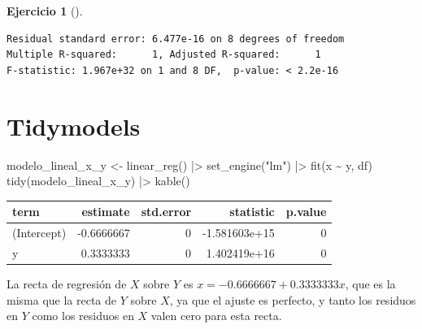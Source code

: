 \documentclass[
  a4paper,
]{scrreport}
\newenvironment{Shaded}{\begin{snugshade}}{\end{snugshade}}
\newcommand{\FunctionTok}[1]{\textcolor[rgb]{0.28,0.35,0.67}{#1}}
\newcommand{\NormalTok}[1]{\textcolor[rgb]{0.00,0.23,0.31}{#1}}
\newcommand{\OtherTok}[1]{\textcolor[rgb]{0.00,0.23,0.31}{#1}}
\newcommand{\SpecialCharTok}[1]{\textcolor[rgb]{0.37,0.37,0.37}{#1}}
\newcommand{\StringTok}[1]{\textcolor[rgb]{0.13,0.47,0.30}{#1}}
\theoremstyle{definition}
\newtheorem{exercise}{Ejercicio}[chapter]
\theoremstyle{remark}
\begin{document}
\begin{exercise}[]
\begin{enumerate}
\begin{tcolorbox}
\begin{verbatim}
Residual standard error: 6.477e-16 on 8 degrees of freedom
Multiple R-squared:      1, Adjusted R-squared:      1 
F-statistic: 1.967e+32 on 1 and 8 DF,  p-value: < 2.2e-16
\end{verbatim}

  \section{Tidymodels}

\begin{Shaded}
\begin{Highlighting}[]
\NormalTok{modelo\_lineal\_x\_y }\OtherTok{\textless{}{-}} \FunctionTok{linear\_reg}\NormalTok{() }\SpecialCharTok{|\textgreater{}}
  \FunctionTok{set\_engine}\NormalTok{(}\StringTok{"lm"}\NormalTok{) }\SpecialCharTok{|\textgreater{}} 
  \FunctionTok{fit}\NormalTok{(x }\SpecialCharTok{\textasciitilde{}}\NormalTok{ y, df)}
\FunctionTok{tidy}\NormalTok{(modelo\_lineal\_x\_y) }\SpecialCharTok{|\textgreater{}} \FunctionTok{kable}\NormalTok{()}
\end{Highlighting}
\end{Shaded}

  \begin{longtable}[]{@{}lrrrr@{}}
  \toprule\noalign{}
  term & estimate & std.error & statistic & p.value \\
  \midrule\noalign{}
  \endhead
  \bottomrule\noalign{}
  \endlastfoot
  (Intercept) & -0.6666667 & 0 & -1.581603e+15 & 0 \\
  y & 0.3333333 & 0 & 1.402419e+16 & 0 \\
  \end{longtable}

  La recta de regresión de \(X\) sobre \(Y\) es
  \(x = -0.6666667 + 0.3333333 x\), que es la misma que la recta de
  \(Y\) sobre \(X\), ya que el ajuste es perfecto, y tanto los residuos
  en \(Y\) como los residuos en \(X\) valen cero para esta recta.

  \end{tcolorbox}
\end{enumerate}

\end{exercise}
\end{document}
